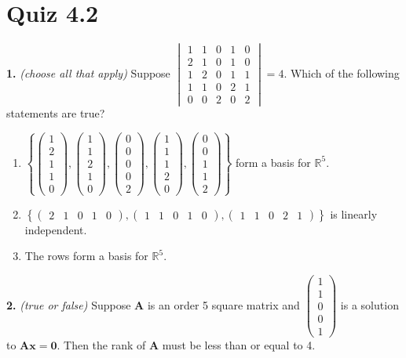 \documentclass[10pt,a4paper]{article}
\begin{document}
\section{Quiz 4.2}
\textbf{1.} \textit{(choose all that apply)} Suppose \(\begin{vmatrix}1&1&0&1&0\\2&1&0&1&0\\1&2&0&1&1\\1&1&0&2&1\\0&0&2&0&2\end{vmatrix}=4\). Which of the following statements are true?

\begin{enumerate}[label=(\Alph*)]
\item \(\left\{\begin{pmatrix}1\\2\\1\\1\\0\end{pmatrix},\begin{pmatrix}1\\1\\2\\1\\0\end{pmatrix},\begin{pmatrix}0\\0\\0\\0\\2\end{pmatrix},\begin{pmatrix}1\\1\\1\\2\\0\end{pmatrix},\begin{pmatrix}0\\0\\1\\1\\2\end{pmatrix}\right\}\) form a basis for \(\mathbb{R}^5\).
\item \(\left\{\begin{pmatrix}2&1&0&1&0\end{pmatrix},\begin{pmatrix}1&1&0&1&0\end{pmatrix},\begin{pmatrix}1&1&0&2&1\end{pmatrix}\right\}\) is linearly independent.
\item The rows form a basis for \(\mathbb{R}^5\).
\end{enumerate}
\smallskip
\textbf{2.} \textit{(true or false)} Suppose \(\mathbf{A}\) is an order 5 square matrix and \(\begin{pmatrix}1\\1\\0\\0\\1\end{pmatrix}\) is a solution to \(\mathbf{Ax}=\mathbf{0}\). Then the rank of \(\mathbf{A}\) must be less than or equal to 4.
\end{document}
